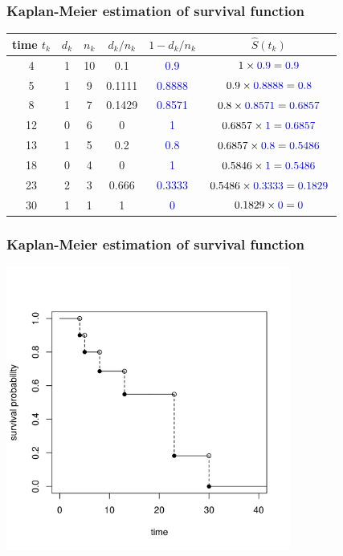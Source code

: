 \documentclass[10pt,t]{beamer}
\begin{document}
\begin{frame}
\frametitle{Kaplan-Meier estimation of survival function}

\begin{tabular}{|c|c|c|c|c|c|}
\hline
time $t_k$ & $d_k$ & $n_k$ & $d_k/n_k$ & $1 - d_k/n_k$ & $\widehat{S}(t_k)$ \\
\hline
4 & 1 & 10 & 0.1 & \textcolor{blue}{0.9} & $1 \times \textcolor{blue}{0.9} = \textcolor{blue}{0.9}$\\
5 & 1 & 9 & 0.1111 & \textcolor{blue}{0.8888} & $0.9 \times \textcolor{blue}{0.8888} = \textcolor{blue}{0.8}$ \\
8 & 1 & 7 & 0.1429 & \textcolor{blue}{0.8571} & $0.8 \times \textcolor{blue}{0.8571} = \textcolor{blue}{0.6857}$\\
12 & 0 & 6 & 0 & \textcolor{blue}{1} & $0.6857 \times \textcolor{blue}{1} = \textcolor{blue}{0.6857}$\\
13 & 1 & 5 & 0.2 & \textcolor{blue}{0.8} & $0.6857 \times \textcolor{blue}{0.8} = \textcolor{blue}{0.5486}$\\
18 & 0 & 4 & 0 & \textcolor{blue}{1} & $0.5846 \times \textcolor{blue}{1} = \textcolor{blue}{0.5486}$\\
23 & 2 & 3 & 0.666 & \textcolor{blue}{0.3333} & $0.5486 \times \textcolor{blue}{0.3333} = \textcolor{blue}{0.1829}$\\
30 & 1 & 1 & 1 & \textcolor{blue}{0} & $0.1829 \times \textcolor{blue}{0} = \textcolor{blue}{0}$\\
\hline
\end{tabular}
\end{frame}

\begin{frame}
\frametitle{Kaplan-Meier estimation of survival function}

\centering
\includegraphics[width=0.7\textwidth]{figs/km_small_example.png}
\end{frame}
\end{document}
